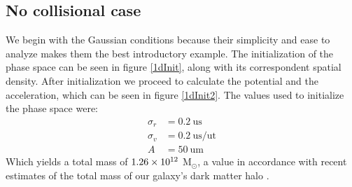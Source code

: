 \subsection{No collisional case}
We begin with the Gaussian conditions because their simplicity and ease to analyze makes them the best introductory example.
The initialization of the phase space can be seen in figure \ref{1dInit}, along with its correspondent spatial density.
After initialization we proceed to calculate the potential and the acceleration, which can be seen in figure \ref{1dInit2}.
The values used to initialize the phase space were:
\begin{align}
\sigma_r &= 0.2 \ \text{us} \\
\sigma_v &= 0.2 \ \text{us} / \text{ut} \\
A &= 50  \ \text{um}
\end{align} %
Which yields a total mass of $1.26\times 10^{12}$ M$_{\odot}$, a value in accordance with recent estimates of the total mass of our galaxy's dark matter halo \cite{2013JCAP07016N}. %

